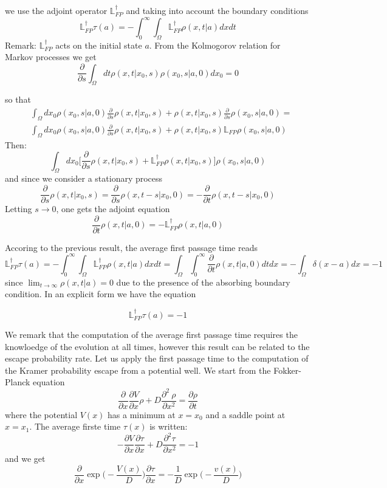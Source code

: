 we use the adjoint operator $\mathbb{L}_{FP}^{\dagger}$ and taking into account the boundary conditions 
$$
\mathbb{L}_{FP}^{\dagger} \tau(a) = -\int_{0}^{\infty}\int_{\Omega} \mathbb{L}_{FP}^{\dagger} \rho(x,t|a)dx dt
$$
Remark: $\mathbb{L}_{FP}^{\dagger}$ acts on the initial state $a$. From the Kolmogorov relation for Markov processes we get 
$$
\frac{\partial}{\partial s} \int_{\Omega} dt \rho(x,t|x_0,s)\rho(x_0,s|a,0)dx_0 = 0
$$

so that 
\begin{equation}
\begin{split}
& \int_{\Omega} dx_0 \rho(x_0,s|a,0)\frac{\partial}{\partial s} \rho(x,t|x_0,s) + 
\rho(x,t|x_0,s) \frac{\partial}{\partial s} \rho(x_0,s|a,0)
  = \\ 
& \int_{\Omega} dx_0 \rho(x_0,s|a,0)  \frac{\partial}{\partial s} \rho(x,t|x_0,s) + 
 \rho(x,t|x_0,s) \mathbb{L}_{FP} \rho(x_0,s|a,0)
\end{split}
\end{equation}
Then:
$$
\int_{\Omega} dx_0 \biggl[ \frac{\partial}{\partial s} \rho(x,t|x_0,s) + \mathbb{L}_{FP}^{\dagger} \rho (x,t|x_0,s) \biggr] \rho(x_0,s|a,0) 
$$
and since we consider a stationary process 
$$
\frac{\partial}{\partial s} \rho(x,t|x_0,s) = \frac{\partial}{\partial s} \rho (x,t -s|x_0,0) = - \frac{\partial}{\partial t} \rho(x,t-s|x_0,0)
$$
Letting $s \to 0$, one gets the adjoint equation
$$
\frac{\partial}{\partial t } \rho(x,t|a,0) = - \mathbb{L}_{FP}^{\dagger} \rho(x,t|a,0)
$$

Accoring to the previous result, the average first passage time reads
$$
\mathbb{L}_{FP}^{\dagger} \tau(a) = - \int_{0}^{\infty} \int_{\Omega} \mathbb{L}_{FP}^{\dagger} \rho(x,t|a)dx dt = \int_{\Omega}\int_{0}^{\infty} \frac{\partial}{\partial t} \rho(x,t|a,0)dt dx = - \int _{\Omega} \delta (x-a ) dx = -1
$$
 since $\lim_{t \to \infty} \rho(x,t|a) = 0 $ due to the presence of the absorbing boundary condition.
In an explicit form we have the equation 

\begin{equation}
\mathbb{L}_{FP}^{\dagger} \tau(a) = -1
\end{equation}

We remark that the computation of the average first passage time requires the knowloedge of the evolution at all times, however this result can be related to the escape probability rate. Let us apply the first passage time to the computation of the Kramer probability escape from a potential well.
We start from the Fokker-Planck equation 
$$
\frac{\partial}{\partial x} \frac{\partial V}{\partial x} \rho + D \frac{\partial ^2 \
\rho }{\partial x^2} = \frac{\partial 
\rho }{ \partial t}
$$
where the potential $V(x)$ has a minimum at $x = x_0$ and a saddle point at $x = x_1$.
The average firste time $\tau(x)$ is written:
$$
-\frac{\partial V}{\partial x}\frac{\partial \tau}{\partial x} + D \frac{\partial ^2 \tau}{\partial x^2} = -1
$$
and we get 
$$
\frac{\partial}{\partial x} \exp \biggl(-\frac{V(x)}{D}\biggr) \frac{\partial \tau}{\partial x} = - \frac{1}{D} \exp \biggl( - \frac{v(x)}{D}\biggr)
$$

